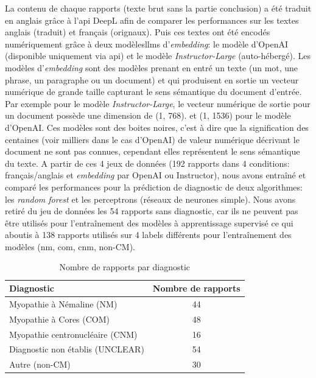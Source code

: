 La contenu de chaque rapports (texte brut sans la partie conclusion) a été traduit en anglais grâce à l'\gls{api} DeepL afin de comparer les performances sur les textes anglais (traduit) et français (orignaux). Puis ces textes ont été encodés numériquement grâce à deux modèles\gls{llms} d'\textit{embedding}: le modèle d'OpenAI (disponible uniquement via \gls{api}) et le modèle \textit{Instructor-Large} (auto-hébergé). Les modèles d'\textit{embedding} sont des modèles prenant en entré un texte (un mot, une phrase, un paragraphe ou un document) et qui produisent en sortie un vecteur numérique de grande taille capturant le sens sémantique du document d'entrée. Par exemple pour le modèle \textit{Instructor-Large}, le vecteur numérique de sortie pour un document possède une dimension de (1, 768). et (1, 1536) pour le modèle d'OpenAI. Ces modèles sont des boites noires, c'est à dire que la signification des centaines (voir milliers dans le cas d'OpenAI) de valeur numérique décrivant le document ne sont pas connues, cependant elles représentent le sens sémantique du texte.
A partir de ces 4 jeux de données (192 rapports dans 4 conditions: français/anglais et \textit{embedding} par OpenAI ou Instructor), nous avons entraîné et comparé les performances pour la prédiction de diagnostic de deux algorithmes: les \textit{random forest} et les perceptrons (réseaux de neurones simple). Nous avons retiré du jeu de données les 54 rapports sans diagnostic, car ils ne peuvent pas être utilisés pour l'entraînement des modèles à apprentissage supervisé ce qui aboutis à 138 rapports utilisés sur 4 labels différents pour l'entraînement des modèles (\gls{nm}, \gls{com}, \gls{cnm}, non-CM).
\begin{table}[htbp]
\centering
\caption{Nombre de rapports par diagnostic}
\label{tab:number_patients}
\begin{tabular}{|l|c|}
\hline
\textbf{Diagnostic} & \textbf{Nombre de rapports} \\
\hline
Myopathie à Némaline (NM) & 44 \\
\hline
Myopathie à Cores (COM) & 48 \\
\hline
Myopathie centronucléaire (CNM) & 16 \\
\hline
Diagnostic non établis (UNCLEAR) & 54 \\
\hline
Autre (non-CM) & 30 \\
\hline
\end{tabular}
\end{table}

